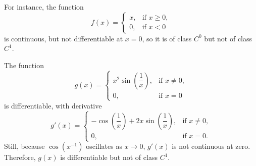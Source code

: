 For instance, the function
$$
\displaystyle f(x)={\begin{cases}x,&{\mbox{if }}x\geq 0,\\0,&{\text{if }}x<0\end{cases}}
$$
is continuous, but not differentiable at $x = 0$, so it is of class $C^0$ but not of class $C^1$.

The function
$$
\displaystyle g(x)={\begin{cases}x^{2}\sin {\left({\dfrac {1}{x}}\right)},&{\text{if }}x\neq 0,\\0,&{\text{if }}x=0\end{cases}}
$$
is differentiable, with derivative
$$
\displaystyle g'(x)={\begin{cases}-{\mathord {\cos\left({\dfrac {1}{x}}\right)}}+2x\sin\left({\dfrac {1}{x}}\right),&{\text{if }}x\neq 0,\\0,&{\text{if }}x=0.\end{cases}}
$$
Still, because $\cos \left(x^{-1}\right)$ oscillates as $x\to 0$, $g'(x)$ is not continuous at zero. Therefore, $g(x)$ is differentiable but not of class $C^1$.


\fi

